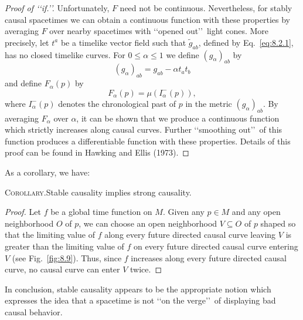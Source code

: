 \begin{proof}[Proof of \lq\lq if.\rq\rq]
Unfortunately, \(F\) need not be continuous. Nevertheless, for stably causal
spacetimes we can obtain a continuous function with these properties by averaging
\(F\) over nearby spacetimes with \lq\lq opened out\rq\rq\ light cones. More precisely,
let \(t^a\) be a timelike vector field such that \(\widetilde g_{ab}\), defined by
Eq.~\eqref{eq:8.2.1}, has no closed timelike curves. For \(0\leq\alpha\leq1\) we
define \((g_\alpha)_{ab}\) by
\begin{equation}
  (g_\alpha)_{ab}=g_{ab}-\alpha t_at_b
  \tag{8.2.5}\label{eq:8.2.5}
\end{equation}
and define \(F_\alpha(p)\) by
\begin{equation}
  F_\alpha(p)=\mu(I_\alpha^-(p)),
  \tag{8.2.6}\label{eq:8.2.6}
\end{equation}
where \(I_\alpha^-(p)\) denotes the chronological past of \(p\) in the metric
\((g_\alpha)_{ab}\). By averaging \(F_\alpha\) over \(\alpha\), it can be shown that
we produce a continuous function which strictly increases along causal curves.
Further \lq\lq smoothing out\rq\rq\ of this function produces a differentiable function
with these properties. Details of this proof can be found in Hawking and Ellis
(1973).
\end{proof}

As a corollary, we have:

\medskip
\noindent\textsc{Corollary.}\quad Stable causality implies strong causality.
\medskip
\begin{proof}
Let \(f\) be a global time function on \(M\). Given any \(p\in M\) and any open
neighborhood \(O\) of \(p\), we can choose an open neighborhood \(V\subseteq O\)
of \(p\) shaped so that the limiting value of \(f\) along every future directed
causal curve leaving \(V\) is greater than the limiting value of \(f\) on every
future directed causal curve entering \(V\) (see Fig.~\ref{fig:8.9}). Thus, since
\(f\) increases along every future directed causal curve, no causal curve can enter
\(V\) twice.
\end{proof}

In conclusion, stable causality appears to be the appropriate notion which expresses
the idea that a spacetime is not \lq\lq on the verge\rq\rq\ of displaying bad causal
behavior.


